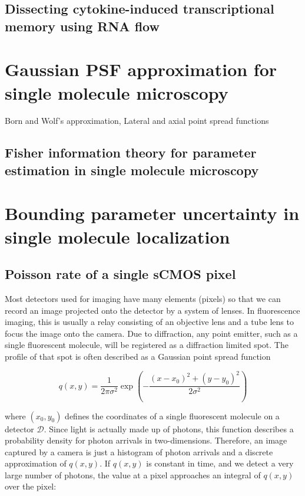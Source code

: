 \documentclass{ucetd}
\begin{document}
\subsection{Dissecting cytokine-induced transcriptional memory using RNA flow}

\section{Gaussian PSF approximation for single molecule microscopy}

Born and Wolf's approximation, Lateral and axial point spread functions

\subsection{Fisher information theory for parameter estimation in single molecule microscopy}

\section{Bounding parameter uncertainty in single molecule localization}

\subsection{Poisson rate of a single sCMOS pixel}

Most detectors used for imaging have many elements (pixels) so that we can record an image projected onto the detector by a system of lenses. In fluorescence imaging, this is usually a relay consisting of an objective lens and a tube lens to focus the image onto the camera. Due to diffraction, any point emitter, such as a single fluorescent molecule, will be registered as a diffraction limited spot. The profile of that spot is often described as a Gaussian point spread function

\begin{equation}
q(x,y) = \frac{1}{2\pi\sigma^{2}}\exp\left(-\frac{(x-x_{0})^{2}+(y-y_{0})^{2}}{2\sigma^{2}}\right)
\end{equation}

where $(x_0,y_0)$ defines the coordinates of a single fluorescent molecule on a detector $\mathcal{D}$. Since light is actually made up of photons, this function describes a probability density for photon arrivals in two-dimensions. Therefore, an image captured by a camera is just a histogram of photon arrivals and a discrete approximation of $q(x,y)$. If $q(x,y)$ is constant in time, and we detect a very large number of photons, the value at a pixel approaches an integral of $q(x,y)$ over the pixel:
\end{document}
